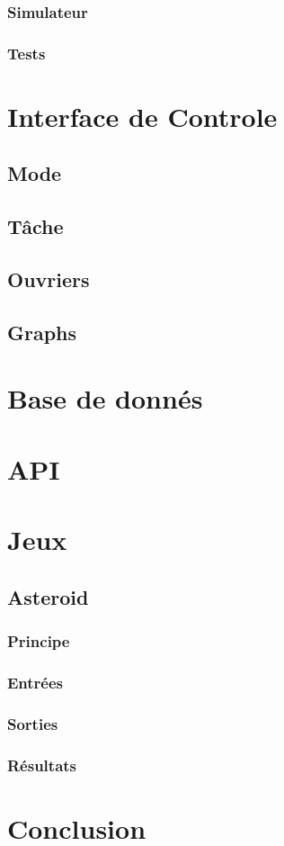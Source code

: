 \documentclass{article}
\begin{document}
\subsubsection{Simulateur}
\subsubsection{Tests}

\newpage
\section{Interface de Controle}
\subsection{Mode}
\subsection{Tâche}
\subsection{Ouvriers}
\subsection{Graphs}

\newpage
\section{Base de donnés}

\newpage
\section{API}

\newpage
\section{Jeux}
\subsection{Asteroid}
\subsubsection{Principe}
\subsubsection{Entrées}
\subsubsection{Sorties}
\subsubsection{Résultats}

\newpage
\section{Conclusion}

\newpage


\end{document}
